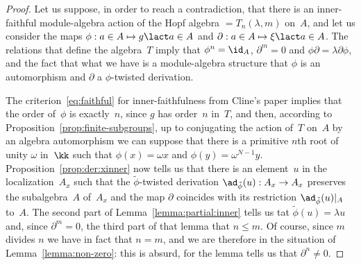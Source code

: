 \begin{proof}
Let us suppose, in order to reach a contradiction, that there is an
inner-faithful module-algebra action of the Hopf algebra $=T_n(\lambda, m)$
on~$A$, and let us consider the maps $\phi:a\in A\mapsto g\lact a\in A$ and
$\partial:a\in A\mapsto \xi\lact a\in A$. The relations that define the
algebra~$T$ imply that $\phi^n=\id_A$, $\partial^m=0$ and
$\phi\partial=\lambda\partial\phi$, and the fact that what we have is a
module-algebra structure that $\phi$ is an automorphism and $\partial$ a
$\phi$-twisted derivation. 

The criterion~\eqref{eq:faithful} for inner-faithfulness from Cline's paper
\cite{Cline} implies that the order of~$\phi$ is exactly~$n$, since $g$ has
order~$n$ in~$T$, and then, according to
Proposition~\ref{prop:finite-subgroups}, up to conjugating the action
of~$T$ on~$A$ by an algebra automorphism we can suppose that there is a
primitive $n$th root of unity $\omega$ in~$\kk$ such that $\phi(x)=\omega
x$ and $\phi(y)=\omega^{N-1}y$. Proposition~\ref{prop:der:xinner} now tells
us that there is an element~$u$ in the localization~$A_x$ such that the
$\tilde\phi$-twisted derivation $\ad_{\tilde\phi}(u):A_x\to A_x$ preserves
the subalgebra~$A$ of~$A_x$ and the map $\partial$ coincides with its
restriction $\ad_{\tilde\phi}(u)|_A$ to~$A$. The second part of
Lemma~\ref{lemma:partial:inner} tells us tat $\tilde\phi(u)=\lambda u$ and,
since $\partial^m=0$, the third part of that lemma that $n\leq m$. Of
course, since $m$ divides $n$ we have in fact that $n=m$, and we are
therefore in the situation of Lemma~\ref{lemma:non-zero}: this is
absurd, for the lemma tells us that $\partial^n\neq0$.
\end{proof}

